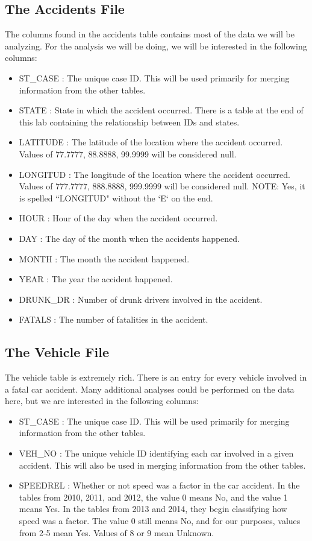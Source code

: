 \subsection*{The Accidents File}
The columns found in the accidents table contains most of the data we will be
analyzing. For the analysis we will be doing, we will be interested in the
following columns:
\begin{itemize}
    \item ST\_CASE : The unique case ID. This will be used primarily for merging
        information from the other tables.
    \item STATE : State in which the accident occurred. There is a table at the
        end of this lab containing the relationship between IDs and states.
    \item LATITUDE : The latitude of the location where the accident occurred.
        Values of 77.7777, 88.8888, 99.9999 will be considered null.
    \item LONGITUD : The longitude of the location where the accident occurred.
        Values of 777.7777, 888.8888, 999.9999 will be considered null.
        NOTE: Yes, it is spelled ``LONGITUD" without the `E` on the end.

    \item HOUR : Hour of the day when the accident occurred.
    \item DAY : The day of the month when the accidents happened.
    \item MONTH : The month the accident happened.
    \item YEAR : The year the accident happened.
    \item DRUNK\_DR : Number of drunk drivers involved in the accident.
    \item FATALS : The number of fatalities in the accident.
\end{itemize}

\subsection*{The Vehicle File}
The vehicle table is extremely rich. There is an entry for every vehicle involved
in a fatal car accident. Many additional analyses could be performed
on the data here, but we are interested in the following columns:
\begin{itemize}
    \item ST\_CASE : The unique case ID. This will be used primarily for merging
        information from the other tables.
    \item VEH\_NO : The unique vehicle ID identifying each car involved in a given
        accident. This will also be used in merging information from the other
        tables.
    \item SPEEDREL : Whether or not speed was a factor in the car accident. In
        the tables from 2010, 2011, and 2012, the value 0 means No, and the
        value 1 means Yes. In the tables from 2013 and 2014, they begin classifying
        how speed was a factor. The value 0 still means No, and for our purposes,
        values from 2-5 mean Yes. Values of 8 or 9 mean Unknown.
\end{itemize}

